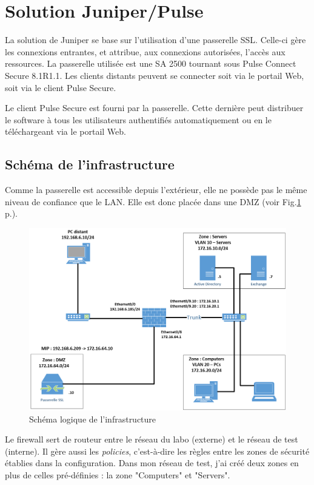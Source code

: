 \section{Solution Juniper/Pulse}
La solution de Juniper se base sur l'utilisation d'une passerelle SSL.
Celle-ci gère les connexions entrantes, et attribue, aux connexions autorisées, l'accès aux ressources.
La passerelle utilisée est une SA 2500 tournant sous Pulse Connect Secure 8.1R1.1.
Les clients distants peuvent se connecter soit via le portail Web, soit via le client Pulse Secure.

Le client Pulse Secure est fourni par la passerelle.
Cette dernière peut distribuer le software à tous les utilisateurs authentifiés automatiquement ou en le téléchargeant via le portail Web.

\subsection{Schéma de l'infrastructure}
Comme la passerelle est accessible depuis l'extérieur, elle ne possède pas le même niveau de confiance que le LAN.
Elle est donc placée dans une DMZ (voir Fig.\ref{fig:schemaJuniper} p.\pageref{fig:schemaJuniper}).
\begin{figure}[ht]
	\centering
	\includegraphics[width=16cm]{juniper/schema.png}
	\caption{Schéma logique de l'infrastructure}
	\label{fig:schemaJuniper}
\end{figure}

Le firewall sert de routeur entre le réseau du labo (externe) et le réseau de test (interne).
Il gère aussi les \textit{policies}, c'est-à-dire les règles entre les zones de sécurité établies dans la configuration.
Dans mon réseau de test, j'ai créé deux zones en plus de celles pré-définies : la zone "Computers" et "Servers".

